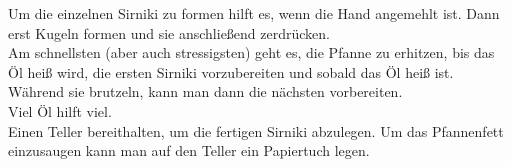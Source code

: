\begin{recipe}
\hint
{%
    Um die einzelnen Sirniki zu formen hilft es, wenn die Hand angemehlt ist. Dann erst Kugeln formen und sie anschließend zerdrücken.\\ 
    Am schnellsten (aber auch stressigsten) geht es, die Pfanne zu erhitzen, bis das Öl heiß wird, die ersten Sirniki vorzubereiten und sobald das Öl heiß ist. Während sie brutzeln, kann man dann die nächsten vorbereiten. \\
    Viel Öl hilft viel. \\
    Einen Teller bereithalten, um die fertigen Sirniki abzulegen. Um das Pfannenfett einzusaugen kann man auf den Teller ein Papiertuch legen.        
}

    \end{recipe}
